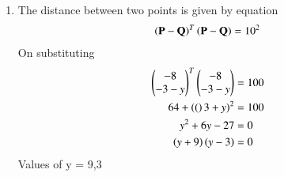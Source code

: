 \renewcommand{\theequation}{\theenumi}
\begin{enumerate}[label=\arabic*.,ref=\thesubsubsection.\theenumi]

 \item The distance between two points is given by equation
 \begin{align}
 \left(\mathbf{P}-\mathbf{Q}\right)^T\left(\mathbf{P}-\mathbf{Q}\right)=10^2
 \end{align}
 On substituting 
 \begin{align}
 \begin{pmatrix}-8\\-3-y\end{pmatrix}^T\begin{pmatrix}-8\\-3-y\end{pmatrix} &= 100 \\
 64 + \left((\right)3+y)^2 &= 100\\
 y^2 + 6y -27 &= 0\\
 \left(y+9\right)\left(y-3\right) &= 0
 \end{align}
 Values of y = 9,3
 
 \end{enumerate}